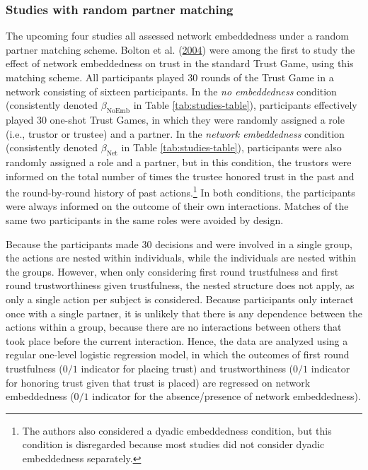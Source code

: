 \documentclass[
  11pt,
]{article}
\begin{document}
\hypertarget{studies-with-random-partner-matching}{%
\subsubsection{Studies with random partner matching}\label{studies-with-random-partner-matching}}

The upcoming four studies all assessed network embeddedness under a random partner matching scheme.
Bolton et al. (\protect\hyperlink{ref-bolton_electronic_2004}{2004}) were among the first to study the effect of network embeddedness on trust in the standard Trust Game, using this matching scheme.
All participants played 30 rounds of the Trust Game in a network consisting of sixteen participants.
In the \emph{no embeddedness} condition (consistently denoted \(\beta_{\text{NoEmb}}\) in Table \ref{tab:studies-table}), participants effectively played 30 one-shot Trust Games, in which they were randomly assigned a role (i.e., trustor or trustee) and a partner.
In the \emph{network embeddedness} condition (consistently denoted \(\beta_{\text{Net}}\) in Table \ref{tab:studies-table}), participants were also randomly assigned a role and a partner, but in this condition, the trustors were informed on the total number of times the trustee honored trust in the past and the round-by-round history of past actions.\footnote{The authors also considered a dyadic embeddedness condition, but this condition is disregarded because most studies did not consider dyadic embeddedness separately.}
In both conditions, the participants were always informed on the outcome of their own interactions.
Matches of the same two participants in the same roles were avoided by design.

Because the participants made 30 decisions and were involved in a single group, the actions are nested within individuals, while the individuals are nested within the groups.
However, when only considering first round trustfulness and first round trustworthiness given trustfulness, the nested structure does not apply, as only a single action per subject is considered.
Because participants only interact once with a single partner, it is unlikely that there is any dependence between the actions within a group, because there are no interactions between others that took place before the current interaction.
Hence, the data are analyzed using a regular one-level logistic regression model, in which the outcomes of first round trustfulness (\(0/1\) indicator for placing trust) and trustworthiness (\(0/1\) indicator for honoring trust given that trust is placed) are regressed on network embeddedness (\(0/1\) indicator for the absence/presence of network embeddedness).
\end{document}

